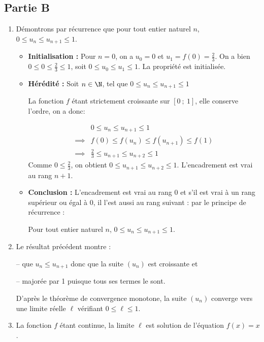 \subsection*{Partie B}
\begin{enumerate}
\item Démontrons par récurrence que pour tout entier naturel $n$, $0 \leqslant u_n \leqslant u_{n+1} \leqslant 1$.
\begin{itemize}
\item \textbf{Initialisation :} Pour $n = 0$, on a $u_0 = 0$ et $u_1 = f(0) = \frac{2}{3}$. On a bien $0 \leqslant 0 \leqslant \frac{2}{3} \leqslant 1$, soit $0 \leqslant u_0 \leqslant u_1 \leqslant 1$. La propriété est initialisée.
\item \textbf{Hérédité :} Soit $n \in \N$, tel que $0 \leqslant u_n \leqslant u_{n+1} \leqslant 1$%

La fonction $f$ étant strictement croissante sur $[0~;~1]$, elle conserve l'ordre, on a donc:

\[\begin{array}{rl}
& 0 \leqslant u_n \leqslant u_{n+1} \leqslant 1 \\
\implies & f(0) \leqslant f(u_n) \leqslant f(u_{n+1}) \leqslant f(1) \\
\implies & \frac{2}{3} \leqslant u_{n+1} \leqslant u_{n+2} \leqslant 1
\end{array}
\]
Comme $0 \leqslant \frac{2}{3}$, on obtient $0 \leqslant u_{n+1} \leqslant u_{n+2} \leqslant 1$. L'encadrement est vrai au rang $n + 1$.
\item \textbf{Conclusion :} L'encadrement est vrai au rang 0 et s'il est vrai à un rang supérieur ou égal à 0, il l'est aussi au rang suivant : par le principe de récurrence :

Pour tout entier naturel $n$, $0 \leqslant u_n \leqslant u_{n+1} \leqslant 1$.
\end{itemize}

\item Le résultat précédent montre :

-- que $u_n \leqslant u_{n+1}$ donc que la suite $(u_n)$ est croissante et 

-- majorée par 1 puisque tous ses termes le sont.

D'après le théorème de convergence monotone, la suite $(u_n)$ converge vers une limite réelle $\ell$ vérifiant $0 \leqslant \ell \leqslant 1$.

\item La fonction $f$ étant continue, la limite $\ell$ est solution de l'équation $f(x) = x$.


\end{enumerate}
